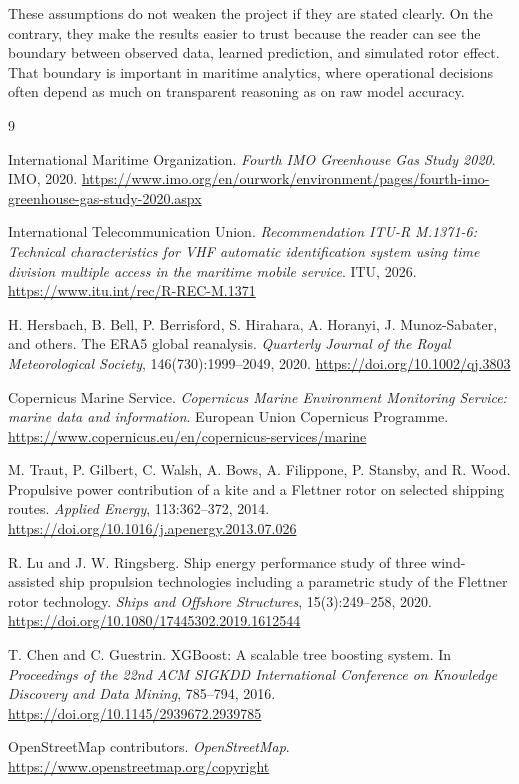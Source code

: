 \documentclass[10pt,a4paper]{article}
\begin{document}
These assumptions do not weaken the project if they are stated clearly. On the
contrary, they make the results easier to trust because the reader can see the
boundary between observed data, learned prediction, and simulated rotor effect.
That boundary is important in maritime analytics, where operational decisions
often depend as much on transparent reasoning as on raw model accuracy.

{}
\label{sec:references}

\begin{thebibliography}{9}

International Maritime Organization.
\newblock \textit{Fourth IMO Greenhouse Gas Study 2020}.
\newblock IMO, 2020.
\newblock \url{https://www.imo.org/en/ourwork/environment/pages/fourth-imo-greenhouse-gas-study-2020.aspx}

International Telecommunication Union.
\newblock \textit{Recommendation ITU-R M.1371-6: Technical characteristics for VHF automatic identification system using time division multiple access in the maritime mobile service}.
\newblock ITU, 2026.
\newblock \url{https://www.itu.int/rec/R-REC-M.1371}

H. Hersbach, B. Bell, P. Berrisford, S. Hirahara, A. Horanyi, J. Munoz-Sabater, and others.
\newblock The ERA5 global reanalysis.
\newblock \textit{Quarterly Journal of the Royal Meteorological Society}, 146(730):1999--2049, 2020.
\newblock \url{https://doi.org/10.1002/qj.3803}

Copernicus Marine Service.
\newblock \textit{Copernicus Marine Environment Monitoring Service: marine data and information}.
\newblock European Union Copernicus Programme.
\newblock \url{https://www.copernicus.eu/en/copernicus-services/marine}

M. Traut, P. Gilbert, C. Walsh, A. Bows, A. Filippone, P. Stansby, and R. Wood.
\newblock Propulsive power contribution of a kite and a Flettner rotor on selected shipping routes.
\newblock \textit{Applied Energy}, 113:362--372, 2014.
\newblock \url{https://doi.org/10.1016/j.apenergy.2013.07.026}

R. Lu and J. W. Ringsberg.
\newblock Ship energy performance study of three wind-assisted ship propulsion technologies including a parametric study of the Flettner rotor technology.
\newblock \textit{Ships and Offshore Structures}, 15(3):249--258, 2020.
\newblock \url{https://doi.org/10.1080/17445302.2019.1612544}

T. Chen and C. Guestrin.
\newblock XGBoost: A scalable tree boosting system.
\newblock In \textit{Proceedings of the 22nd ACM SIGKDD International Conference on Knowledge Discovery and Data Mining}, 785--794, 2016.
\newblock \url{https://doi.org/10.1145/2939672.2939785}

OpenStreetMap contributors.
\newblock \textit{OpenStreetMap}.
\newblock \url{https://www.openstreetmap.org/copyright}

\end{thebibliography}
\end{document}
